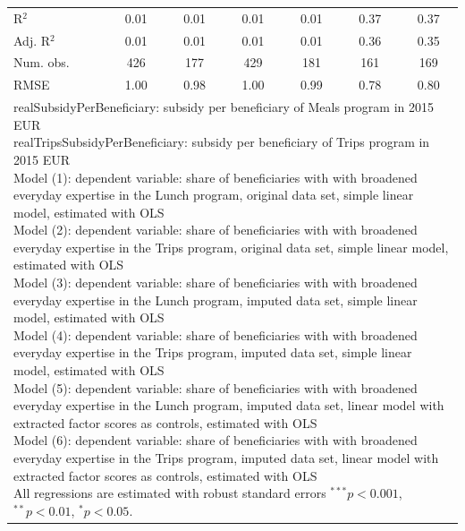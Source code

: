 \begin{frame}[fragile]
\begin{table}
\begin{center}
{\begin{tabular}{l c c c c c c }
\hline
R$^2$                          & 0.01     & 0.01     & 0.01     & 0.01     & 0.37         & 0.37         \\
Adj. R$^2$                     & 0.01     & 0.01     & 0.01     & 0.01     & 0.36         & 0.35         \\
Num. obs.                      & 426      & 177      & 429      & 181      & 161          & 169          \\
RMSE                           & 1.00     & 0.98     & 1.00     & 0.99     & 0.78         & 0.80         \\
\hline
\multicolumn{7}{l}{\scriptsize{\parbox{\linewidth}
{\vspace{2pt} realSubsidyPerBeneficiary: subsidy per beneficiary of Meals program in 2015 EUR \\ realTripsSubsidyPerBeneficiary: subsidy per beneficiary of Trips program in 2015 EUR \\ Model (1): dependent variable: share of beneficiaries with with broadened everyday expertise in the Lunch program, original data set, simple linear model, estimated with OLS \\ Model (2): dependent variable: share of beneficiaries with with broadened everyday expertise in the Trips program, original data set, simple linear model, estimated with OLS \\ Model (3): dependent variable: share of beneficiaries with with broadened everyday expertise in the Lunch program, imputed data set, simple linear model, estimated with OLS \\ Model (4): dependent variable: share of beneficiaries with with broadened everyday expertise in the Trips program, imputed data set, simple linear model, estimated with OLS\\ Model (5): dependent variable: share of beneficiaries with with broadened everyday expertise in the Lunch program, imputed data set, linear model with extracted factor scores as controls, estimated with OLS \\ Model (6): dependent variable: share of beneficiaries with with broadened everyday expertise in the Trips program, imputed data set, linear model with extracted factor scores as controls, estimated with OLS \\ All regressions are estimated with robust standard errors $^{***}p<0.001$, $^{**}p<0.01$, $^*p<0.05$.}}}
\end{tabular}
}
\label{DayToDaySkillsRegressions}
\end{center}
\end{table}


\end{frame}

